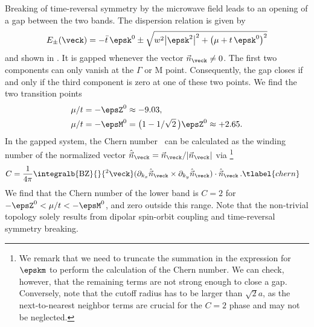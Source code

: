 Breaking of time-reversal symmetry by the microwave field leads to an opening of a gap between the two bands.
The dispersion relation is given by
\begin{align}
    E_\pm(\veck)=- \bar{t}\, \epsk^0 \pm \sqrt{w^2 \big|\epsk^2\big|^2+\big(\mu+t\, \epsk^0\big)^2}
\end{align}
and shown in .
It is gapped whenever the vector $\vec{n}_{\veck}\ne 0$.
The first two components can only vanish at the $\Gamma$ or $\text{M}$ point.
Consequently, the gap closes if and only if the third component is zero at one of these two points.
We find the two transition points
\begin{align}
    \mu/t &= -\epsZ^0 \approx -9.03, \\
    \mu/t &= -\epsM^0 = \big(1-1/\sqrt{2}\,\big)\epsZ^0 \approx +2.65.
\end{align}
In the gapped system, the Chern number~\cite{Hasan2010,Qi2011} can be calculated as the winding number of the normalized vector $\hat{\vec{n}}_\veck = \vec{n}_\veck/|\vec{n}_\veck|$ via
\footnote{We remark that we need to truncate the summation in the expression for $\epskm$ to perform the calculation of the Chern number.
We can check, however, that the remaining terms are not strong enough to close a gap.
Conversely, note that the cutoff radius has to be larger than $\sqrt{2}a$, as the next-to-nearest neighbor terms are crucial for the $C=2$ phase and may not be neglected.}
\begin{align}
    C &= \frac{1}{4\pi}\integralb{\text{BZ}}{}{^2\veck} ( \partial_{k_x} \hat{\vec{n}}_{\veck} \times \partial_{k_y} \hat{\vec{n}}_{\veck} ) \cdot \hat{\vec{n}}_{\veck} \, . \tlabel{chern}
\end{align}
We find that the Chern number of the lower band is $C=2$ for $-\epsZ^0 < \mu/t < -\epsM^0$, and zero outside this range.
Note that the non-trivial topology solely results from dipolar spin-orbit coupling and time-reversal symmetry breaking.





